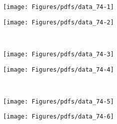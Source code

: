 \newpage
\begin{figure}[t]
 \begin{center}
\begin{subfloat}[]{\texttt{[image: Figures/pdfs/data\_74-1]}
   \label{fig:aschi2scanpdf_a}
 }%
\end{subfloat}
\begin{subfloat}[]{\texttt{[image: Figures/pdfs/data\_74-2]}
   \label{fig:aschi2scanpdf_b}
 }%
\end{subfloat}
\\
\begin{subfloat}[]{\texttt{[image: Figures/pdfs/data\_74-3]}
   \label{fig:aschi2scanpdf_a}
 }%
\end{subfloat}
\begin{subfloat}[]{\texttt{[image: Figures/pdfs/data\_74-4]}
   \label{fig:aschi2scanpdf_b}
 }%
\end{subfloat}
\\
\begin{subfloat}[]{\texttt{[image: Figures/pdfs/data\_74-5]}
   \label{fig:aschi2scanpdf_a}
 }%
\end{subfloat}
\begin{subfloat}[]{\texttt{[image: Figures/pdfs/data\_74-6]}
   \label{fig:aschi2scanpdf_b}
 }%
\end{subfloat}
\end{center}
 \caption{}
 \label{fig:aschi2scanpdf}
\end{figure}